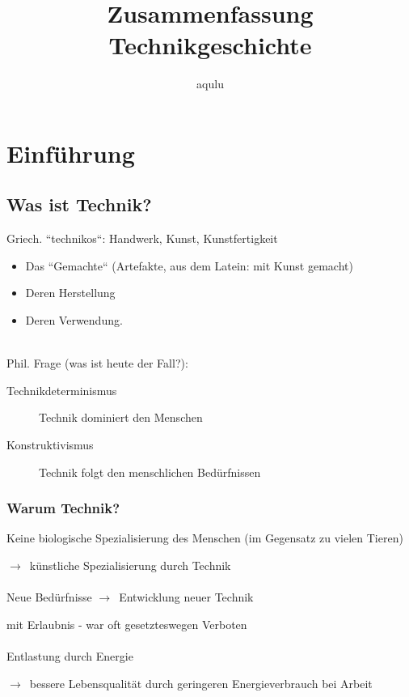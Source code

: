 \documentclass{report}
\begin{document}
\newcommand{\arrow}{$\rightarrow$}

\title{Zusammenfassung Technikgeschichte}
\author{aqulu}
\maketitle
\tableofcontents
\newpage

\chapter{Einführung}

\section{Was ist Technik?}
Griech. ``technikos``: Handwerk, Kunst, Kunstfertigkeit\\
\begin{itemize}
	\item Das ``Gemachte`` (Artefakte, aus dem Latein: mit Kunst gemacht)
	\item Deren Herstellung
	\item Deren Verwendung. 
\end{itemize}~\\
Phil. Frage (was ist heute der Fall?): 
\begin{description}
	\item[Technikdeterminismus] Technik dominiert den Menschen
	\item[Konstruktivismus] Technik folgt den menschlichen Bedürfnissen
\end{description}

\subsection{Warum Technik?}
Keine biologische Spezialisierung des Menschen (im Gegensatz zu vielen Tieren)\par
\arrow~künstliche Spezialisierung durch Technik\\\\
Neue Bedürfnisse \arrow~Entwicklung neuer Technik\par
mit Erlaubnis - war oft gesetzteswegen Verboten\\\\
Entlastung durch Energie\par
\arrow~bessere Lebensqualität durch geringeren Energieverbrauch bei Arbeit

\newpage
\end{document}
